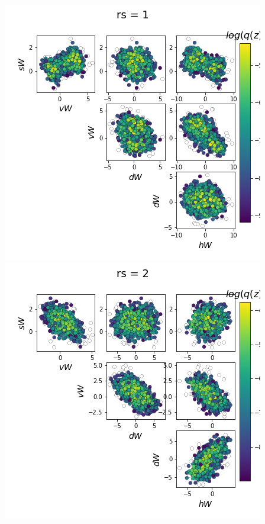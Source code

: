 \documentclass[11pt]{article}
\begin{document}
\begin{center}
\includegraphics[scale=0.33]{figs/Z_SC_pvar_reduced_c=0_p=80_rs=1.png}
\includegraphics[scale=0.33]{figs/Z_SC_pvar_reduced_c=0_p=80_rs=2.png}

\end{center}
\end{document}
